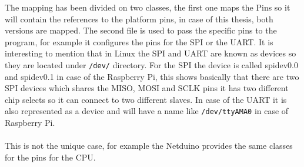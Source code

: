 The mapping has been divided on two classes, the first one maps the Pins so it will contain the references to the platform pins, in case of this thesis, both versions are mapped.
The second file is used to pass the specific pins to the program, for example it configures the pins for the SPI or the UART. It is interesting to mention that in Linux the SPI and UART are known as devices so they are located under \verb!/dev/! directory. For the SPI the device is called spidev0.0 and spidev0.1 in case of the Raspberry Pi, this shows basically that there are two SPI devices which shares the MISO, MOSI and SCLK pins it has two different chip selects so it can connect to two different slaves. In case of the UART it is also represented as a device and will have a name like \verb!/dev/ttyAMA0! in case of Raspberry Pi.
\\
\\
This is not the unique case, for example the Netduino provides the same classes for the pins for the CPU.
